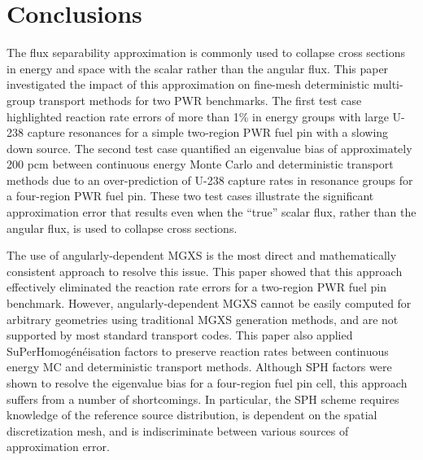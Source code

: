 \section{Conclusions}
\label{sec:conclusions}

The flux separability approximation is commonly used to collapse cross sections in energy and space with the scalar rather than the angular flux. This paper investigated the impact of this approximation on fine-mesh deterministic multi-group transport methods for two PWR benchmarks. The first test case highlighted reaction rate errors of more than 1\% in energy groups with large U-238 capture resonances for a simple two-region PWR fuel pin with a slowing down source. The second test case quantified an eigenvalue bias of approximately 200 pcm between continuous energy Monte Carlo and deterministic transport methods due to an over-prediction of U-238 capture rates in resonance groups for a four-region PWR fuel pin. These two test cases illustrate the significant approximation error that results even when the ``true'' scalar flux, rather than the angular flux, is used to collapse cross sections.


The use of angularly-dependent MGXS is the most direct and mathematically consistent approach to resolve this issue. This paper showed that this approach effectively eliminated the reaction rate errors for a two-region PWR fuel pin benchmark. However, angularly-dependent MGXS cannot be easily computed for arbitrary geometries using traditional MGXS generation methods, and are not supported by most standard transport codes. This paper also applied SuPerHomog\'{e}n\'{e}isation factors to preserve reaction rates between continuous energy MC and deterministic transport methods. Although SPH factors were shown to resolve the eigenvalue bias for a four-region fuel pin cell, this approach suffers from a number of shortcomings. In particular, the SPH scheme requires knowledge of the reference source distribution, is dependent on the spatial discretization mesh, and is indiscriminate between various sources of approximation error.

